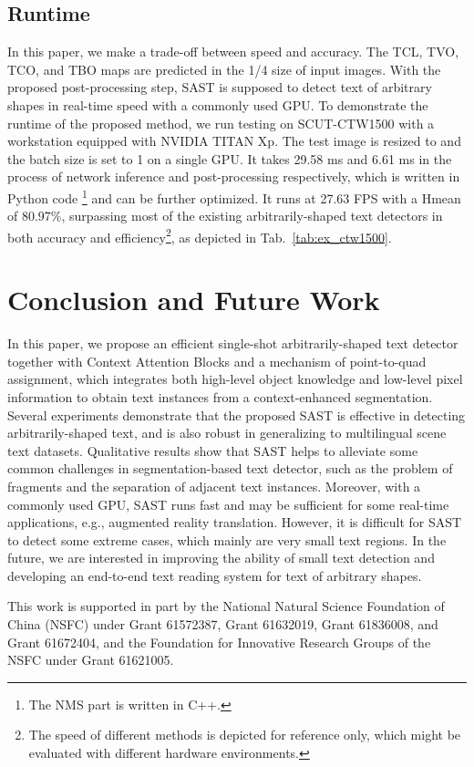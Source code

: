 \documentclass[sigconf]{acmart}
\begin{document}
\subsection{Runtime}
In this paper, we make a trade-off between speed and accuracy. The TCL, TVO, TCO, and TBO maps are predicted in the 1/4 size of input images. With the proposed post-processing step, SAST is supposed to detect text of arbitrary shapes in real-time speed with a commonly used GPU. To demonstrate the runtime of the proposed method, we run testing on SCUT-CTW1500 with a workstation equipped with NVIDIA TITAN Xp. The test image is resized to  and the batch size is set to 1 on a single GPU. It takes 29.58 ms and 6.61 ms in the process of network inference and post-processing respectively, which is written in Python code \footnote{The NMS part is written in C++.} and can be further optimized. It runs at 27.63 FPS with a Hmean of 80.97\%, surpassing most of the existing arbitrarily-shaped text detectors in both accuracy and efficiency\footnote{The speed of different methods is depicted for reference only, which might be evaluated with different hardware environments.}, as depicted in Tab.~\ref{tab:ex_ctw1500}. 








\section{Conclusion and Future Work}
In this paper, we propose an efficient single-shot arbitrarily-shaped text detector together with Context Attention Blocks and a mechanism of point-to-quad assignment, which integrates both high-level object knowledge and low-level pixel information to obtain text instances from a context-enhanced segmentation. Several experiments demonstrate that the proposed SAST is effective in detecting arbitrarily-shaped text, and is also robust in generalizing to multilingual scene text datasets. Qualitative results show that SAST helps to alleviate some common challenges in segmentation-based text detector, such as the problem of fragments and the separation of adjacent text instances. Moreover, with a commonly used GPU, SAST runs fast and may be sufficient for some real-time applications, e.g., augmented reality translation. However, it is difficult for SAST to detect some extreme cases, which mainly are very small text regions. In the future, we are interested in improving the ability of small text detection and developing an end-to-end text reading system for text of arbitrary shapes.



\begin{acks}
  This work is supported in part by the National Natural Science Foundation of
  China (NSFC) under Grant 61572387, Grant 61632019, Grant 61836008,
  and Grant 61672404, and the Foundation for Innovative Research
  Groups of the NSFC under Grant 61621005.
\end{acks}



\end{document}
